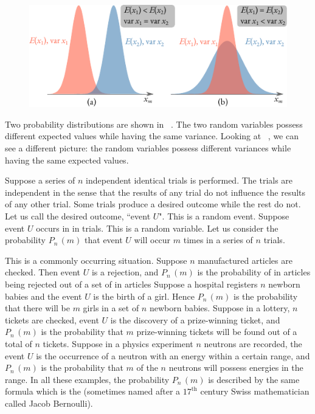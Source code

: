 \begin{figure}[!h]
 \centering
 \includegraphics[width=\textwidth]{figures/exp-val-variation.pdf}
 \end{figure}

Two probability distributions are shown in ~. The two random variables possess different expected values while having the same
variance. Looking at ~, we can see a different
picture: the random variables possess different variances while having
the same expected values.


  Suppose a series of $n$
independent identical trials is performed. The trials are independent
in the sense that the results of any trial do not influence the
results of any other trial. Some trials produce a desired outcome
while the rest do not. Let us call the desired outcome, ``event
$U$". This is a random event. Suppose event $U$ occurs in in trials. This
is a random variable. Let us consider the probability $P_{n}\,(m)$ that event
$U$ will occur $m$ times in a series of $n$ trials.


This is a commonly occurring situation. Suppose $n$ manufactured
articles are checked. Then event $U$ is a rejection, and $P_{n}\,(m)$ is
the probability of in articles being rejected out of a set of in
articles Suppose a hospital registers $n$ newborn babies and the event
$U$ is the birth of a girl. Hence $P_{n}\,(m)$ is the probability that
there will be $m$ girls in a set of $n$ newborn babies. Suppose in a
lottery, $n$ tickets are checked, event $U$ is the discovery of a
prize-winning ticket, and $P_{n}\,(m)$ is the probability that $m$
prize-winning tickets will be found out of a total of $n$
tickets. Suppose in a physics experiment $n$ neutrons are recorded,
the event $U$ is the occurrence of a neutron with an energy within a
certain range, and $P_{n}\,(m)$ is the probability that $m$ of the $n$
neutrons will possess energies in the range. In all these examples,
the probability  $P_{n}\,(m)$ is described by the same formula which is the
 (sometimes named after a $17^{\text{th}}$ century Swiss mathematician called Jacob Bernoulli).

